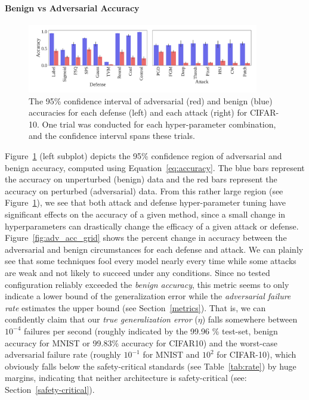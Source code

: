 \documentclass[journal]{IEEEtran}
\begin{document}
\paragraph{Benign vs Adversarial Accuracy}

\begin{figure}[!hptb]
    {\centering
    \includegraphics[trim={0 0.85em 0 0.4em},clip,width=0.9\textwidth]{images/cifar-10/accuracy_plot.pdf}
    \vspace{-1em}
    \caption{The 95\% confidence interval of adversarial (red) and benign (blue) accuracies for each defense (left) and each attack (right) for CIFAR-10. One trial was conducted for each hyper-parameter combination, and the confidence interval spans these trials.}
    \label{fig:acc}
    } %
\end{figure}

Figure~\ref{fig:acc} (left subplot) depicts the 95\% confidence region of adversarial and benign accuracy, computed using Equation~\ref{eq:accuracy}. The blue bars represent the accuracy on unperturbed (benign) data and the red bars represent the accuracy on perturbed (adversarial) data. From this rather large region (see Figure~\ref{fig:acc}), we see that both attack and defense hyper-parameter tuning have significant effects on the accuracy of a given method, since a small change in hyperparameters can drastically change the efficacy of a given attack or defense. Figure~\ref{fig:adv_acc_grid} shows the percent change in accuracy between the adversarial and benign circumstances for each defense and attack. We can plainly see that some techniques fool every model nearly every time while some attacks are weak and not likely to succeed under any conditions. Since no tested configuration reliably exceeded the \textit{benign accuracy}, this metric seems to only indicate a lower bound of the generalization error while the \textit{adversarial failure rate} estimates the upper bound (see Section~\ref{metrics}). That is, we can confidently claim that our \textit{true generalization error} ($\eta$) falls somewhere between $10^{-4}$ failures per second (roughly indicated by the 99.96 \% test-set, benign accuracy for MNIST or 99.83\% accuracy for CIFAR10) and the worst-case adversarial failure rate  (roughly $10^{-1}$ for MNIST and $10^{2}$ for CIFAR-10), which obviously falls below the safety-critical standards (see Table~\ref{tab:rate}) by huge margins, indicating that neither architecture is safety-critical (see: Section~\ref{safety-critical}).
\end{document}
